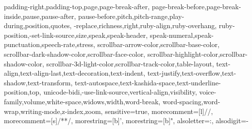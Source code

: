 {{         padding-right,padding-top,page,page-break-after,
         page-break-before,page-break-inside,pause,pause-after,
         pause-before,pitch,pitch-range,play-during,position,quotes,
         -replace,richness,right,ruby-align,ruby-overhang,
         ruby-position,-set-link-source,size,speak,speak-header,
         speak-numeral,speak-punctuation,speech-rate,stress,
         scrollbar-arrow-color,scrollbar-base-color,
         scrollbar-dark-shadow-color,scrollbar-face-color,
         scrollbar-highlight-color,scrollbar-shadow-color,
         scrollbar-3d-light-color,scrollbar-track-color,table-layout,
         text-align,text-align-last,text-decoration,text-indent,
         text-justify,text-overflow,text-shadow,text-transform,
         text-autospace,text-kashida-space,text-underline-position,top,
         unicode-bidi,-use-link-source,vertical-align,visibility,
         voice-family,volume,white-space,widows,width,word-break,
         word-spacing,word-wrap,writing-mode,z-index,zoom},
   sensitive=true,
   morecomment=[l]{//},
   morecomment=[s]{/*}{*/},
   morestring=[b]',
   morestring=[b]",
   alsoletter={:},
   alsodigit={-}
}

